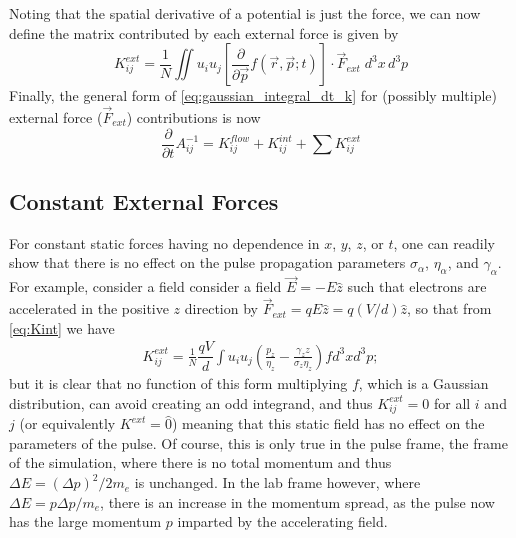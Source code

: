 Noting that the spatial derivative of a potential is just the force, we can now define the matrix contributed by each external force is given by
\begin{equation} \label{eq:Kint}
  K^{ext}_{ij} = \frac{1}{N} \iint u_i u_j \left [ \frac{\partial}{\partial \vec{p}} f(\vec{r}, \vec{p}; t) \right ] \cdot \vec{F}_{ext}\;d^{3}x\,d^{3}p
\end{equation}
Finally, the general form of \ref{eq:gaussian_integral_dt_k} for (possibly multiple) external force ($\vec{F}_{ext}$) contributions is now
\begin{equation}
  \frac{\partial}{\partial t} A^{-1}_{ij} = K^{flow}_{ij} + K^{int}_{ij} + \sum K^{ext}_{ij}
\end{equation}

\subsection{Constant External Forces} \label{sec:const_force}

For constant static forces having no dependence in $ x $, $ y $, $ z $, or $ t $, one can readily show that there is no effect on the pulse propagation parameters $ \sigma_{ \alpha } $, $ \eta_{ \alpha } $, and $ \gamma_{ \alpha } $.
For example, consider a field consider a field $ \vec{E} = -E \hat{z} $ such that electrons are accelerated in the positive $ z $ direction by $ \vec{F}_{ext} = qE \hat{z} = q ( V / d ) \hat{z} $, so that from \ref{eq:Kint} we have
\begin{equation}
 \begin{split} 
  K^{ext}_{ij} = \frac{1} {N} \dfrac{qV} {d} \int{ u_{i} u_{j} \left( \frac{p_{z}} {\eta_{z}} - \frac{\gamma_{z} z} {\sigma_{z} \eta_{z}} \right) f d^{3}x   d^{3}p } ;
 \end{split}
\end{equation}
but it is clear that no function of this form multiplying $ f $, which is a Gaussian distribution, can avoid creating an odd integrand, and thus $ K_{ij}^{ext} = 0 $ for all $ i $ and $ j $ (or equivalently $ K^{ext} = \hat{0} $) meaning that this static field has no effect on the parameters of the pulse.
Of course, this is only true in the pulse frame, the frame of the simulation, where there is no total momentum and thus $ \Delta E = \left( \Delta p \right)^{2} / 2 m_{e} $ is unchanged.
In the lab frame however, where  $ \Delta E = p \Delta p / m_{e} $, there is an increase in the momentum spread, as the pulse now has the large momentum $p$ imparted by the accelerating field.

